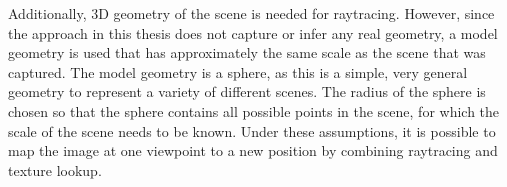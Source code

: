 Additionally, 3D geometry of the scene is needed for raytracing. However, since the approach in this thesis does not capture or infer any real geometry, a model geometry is used that has approximately the same scale as the scene that was captured. The model geometry is a sphere, as this is a simple, very general geometry to represent a variety of different scenes. The radius of the sphere is chosen so that the sphere contains all possible points in the scene, for which the scale of the scene needs to be known. Under these assumptions, it is possible to map the image at one viewpoint to a new position by combining raytracing and texture lookup.


